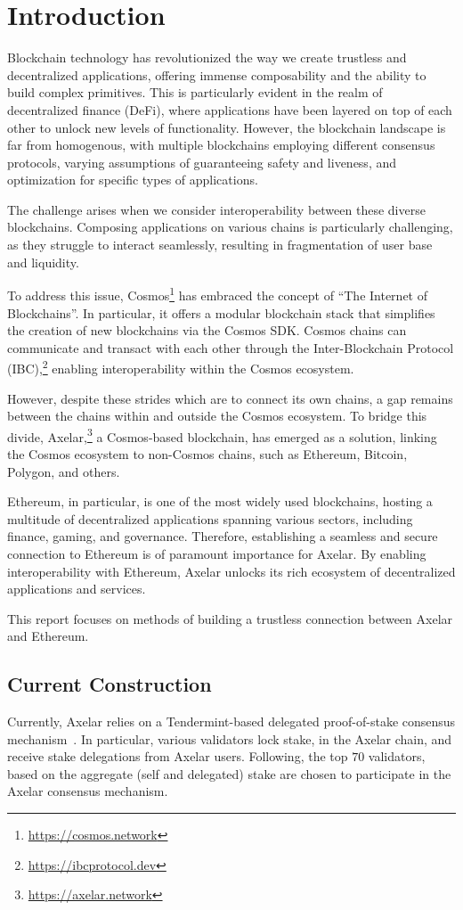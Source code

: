 \section{Introduction}
Blockchain technology has revolutionized the way we create trustless and decentralized applications, offering immense composability and the ability to build complex primitives. This is particularly evident in the realm of decentralized finance (DeFi), where applications have been layered on top of each other to unlock new levels of functionality. However, the blockchain landscape is far from homogenous, with multiple blockchains employing different consensus protocols, varying assumptions of guaranteeing safety and liveness, and optimization for specific types of applications.

The challenge arises when we consider interoperability between these diverse blockchains. Composing applications on various chains is particularly challenging, as they struggle to interact seamlessly, resulting in fragmentation of user base and liquidity.

To address this issue, Cosmos\footnote{\url{https://cosmos.network}} has embraced the concept of ``The Internet of Blockchains''. In particular, it offers a modular blockchain stack that simplifies the creation of new blockchains via the Cosmos SDK. Cosmos chains can communicate and transact with each other through the Inter-Blockchain Protocol (IBC),\footnote{\url{https://ibcprotocol.dev}} enabling interoperability within the Cosmos ecosystem.

However, despite these strides which are to connect its own chains, a gap remains between the chains within and outside the Cosmos ecosystem. To bridge this divide, Axelar,\footnote{\url{https://axelar.network}} a Cosmos-based blockchain, has emerged as a solution, linking the Cosmos ecosystem to non-Cosmos chains, such as Ethereum, Bitcoin, Polygon, and others.

Ethereum, in particular, is one of the most widely used blockchains, hosting a multitude of decentralized applications spanning various sectors, including finance, gaming, and governance. Therefore, establishing a seamless and secure connection to Ethereum is of paramount importance for Axelar. By enabling interoperability with Ethereum, Axelar unlocks its rich ecosystem of decentralized applications and services.

This report focuses on methods of building a trustless connection between Axelar and Ethereum.

\subsection{Current Construction}
Currently, Axelar relies on a Tendermint-based delegated proof-of-stake consensus mechanism~\cite{axelar-whitepaper}. In particular, various validators lock stake, in the Axelar chain, and receive stake delegations from Axelar users. Following, the top $70$ validators, based on the aggregate (self and delegated) stake are chosen to participate in the Axelar consensus mechanism.

